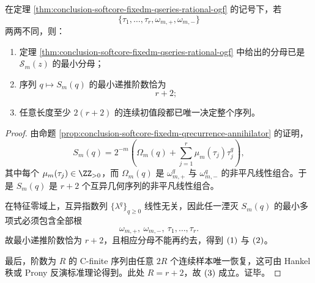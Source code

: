 \begin{theorem}\label{thm:conclusion-softcore-fixedm-qrecurrence-generic-minimality}
在定理 \ref{thm:conclusion-softcore-fixedm-qseries-rational-ogf} 的记号下，若
\[
\{\tau_1,\dots,\tau_r,\omega_{m,+},\omega_{m,-}\}
\]
两两不同，则：
\begin{enumerate}
  \item 定理 \ref{thm:conclusion-softcore-fixedm-qseries-rational-ogf} 中给出的分母已是 \(\mathcal S_m(z)\) 的最小分母；
  \item 序列 \(q\mapsto S_m(q)\) 的最小递推阶数恰为
  \[
  r+2;
  \]
  \item 任意长度至少 \(2(r+2)\) 的连续初值段都已唯一决定整个序列。
\end{enumerate}
\end{theorem}
\begin{proof}
由命题 \ref{prop:conclusion-softcore-fixedm-qrecurrence-annihilator} 的证明，
\[
S_m(q)
=
2^{-m}\left(
\Omega_m(q)+\sum_{j=1}^{r}\mu_m(\tau_j)\tau_j^q
\right),
\]
其中每个 \(\mu_m(\tau_j)\in\ZZ_{>0}\)，而 \(\Omega_m(q)\) 是 \(\omega_{m,+}^q\) 与 \(\omega_{m,-}^q\) 的非平凡线性组合。于是 \(S_m(q)\) 是 \(r+2\) 个互异几何序列的非平凡线性组合。

在特征零域上，互异指数列 \(\{\lambda^q\}_{q\ge0}\) 线性无关，因此任一湮灭 \(S_m(q)\) 的最小多项式必须包含全部根
\[
\omega_{m,+},\ \omega_{m,-},\ \tau_1,\dots,\tau_r.
\]
故最小递推阶数恰为 \(r+2\)，且相应分母不能再约去，得到 \(\textup{(1)}\) 与 \(\textup{(2)}\)。

最后，阶数为 \(R\) 的 C-finite 序列由任意 \(2R\) 个连续样本唯一恢复，这可由 Hankel 秩或 Prony 反演标准理论得到。此处 \(R=r+2\)，故 \(\textup{(3)}\) 成立。证毕。
\end{proof}

